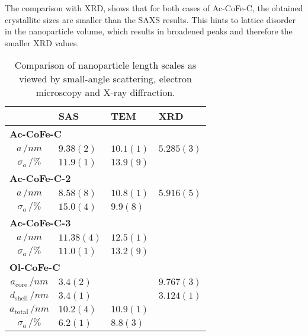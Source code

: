 \documentclass[\main/dresen_thesis.tex]{subfiles}
\begin{document}
    The comparison with XRD, shows that for both cases of Ac-CoFe-C, the obtained crystallite sizes are smaller than the SAXS results.
    This hints to lattice disorder in the nanoparticle volume, which results in broadened peaks and therefore the smaller XRD values.
    \begin{table}[!htbp]
      \centering
      \caption{\label{tab:monolayers:nanoparticle:saxs:sizeComparison}Comparison of nanoparticle length scales as viewed by small-angle scattering, electron microscopy and X-ray diffraction.}
      \begin{tabular}{ c | l | l | l }
                            & \textbf{SAS} & \textbf{TEM} & \textbf{XRD}\\
        \hline
        \multicolumn{4}{l}{\textbf{Ac-CoFe-C}}\\
        \hline
        $a \, / \unit{nm}$  & $9.38(2)$       & $10.1(1)$ & $5.285(3)$\\
        $\sigma_a \, / \%$  & $11.9(1)$       & $13.9(9)$ & \\
        \hline
        \multicolumn{4}{l}{\textbf{Ac-CoFe-C-2}}\\
        \hline
        $a \, / \unit{nm}$  & $8.58(8)$       & $10.8(1)$ & $5.916(5)$\\
        $\sigma_a \, / \%$  & $15.0(4)$       & $9.9(8)$  & \\
        \hline
        \multicolumn{4}{l}{\textbf{Ac-CoFe-C-3}}\\
        \hline
        $a \, / \unit{nm}$  & $11.38(4)$       & $12.5(1)$ & \\
        $\sigma_a \, / \%$  & $11.0(1)$        & $13.2(9)$ & \\
        \hline
        \multicolumn{4}{l}{\textbf{Ol-CoFe-C}}\\
        \hline
        $a_\mathrm{core} \, / \unit{nm}$      & $3.4(2)$        &           & $9.767(3)$\\
        $d_\mathrm{shell} \, / \unit{nm}$     & $3.4(1)$        &           & $3.124(1)$\\
        $a_\mathrm{total} \, / \unit{nm}$     & $10.2(4)$       & $10.9(1)$ & \\
        $\sigma_a \, / \%$                    & $6.2(1)$        & $8.8(3)$  & \\
        \hline
      \end{tabular}
    \end{table}

\end{document}
